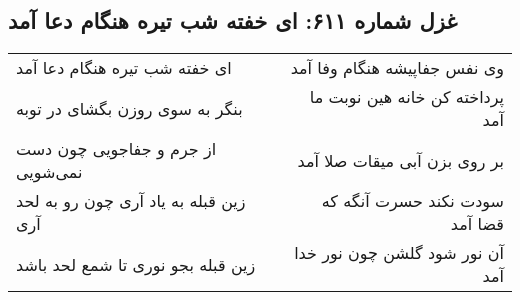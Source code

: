 \begin{center}
\section*{غزل شماره ۶۱۱: ای خفته شب تیره هنگام دعا آمد}
\label{sec:0611}
\begin{longtable}{l p{0.5cm} r}
ای خفته شب تیره هنگام دعا آمد
&&
وی نفس جفاپیشه هنگام وفا آمد
\\
بنگر به سوی روزن بگشای در توبه
&&
پرداخته کن خانه هین نوبت ما آمد
\\
از جرم و جفاجویی چون دست نمی‌شویی
&&
بر روی بزن آبی میقات صلا آمد
\\
زین قبله به یاد آری چون رو به لحد آری
&&
سودت نکند حسرت آنگه که قضا آمد
\\
زین قبله بجو نوری تا شمع لحد باشد
&&
آن نور شود گلشن چون نور خدا آمد
\\
\end{longtable}
\end{center}
